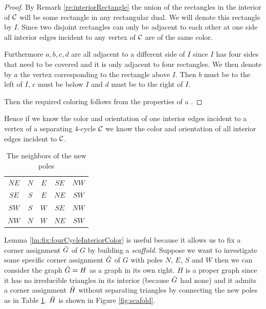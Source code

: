   \begin{proof}
  By Remark \ref{re:interiorRectangle} the union of the rectangles in the interior of $\mathcal{C}$ will be some rectangle in any rectangular dual. We will denote this rectangle by $I$. Since two disjoint rectangles can only be adjacent to each other at one side all interior edges incident to any vertex of $\mathcal{C}$ are of the same color.

  Furthermore $a, b, c, d$ are all adjacent to a different side of $I$ since $I$ has four sides that need to be covered and it is only adjacent to four rectangles. We then denote by $a$ the vertex corresponding to the rectangle above $I$. Then $b$ must be to the left of $I$, $c$ must be below $I$ and $d$ must be to the right of $I$.

  Then the required coloring follows from the properties of a \rel.

  \end{proof}

  Hence if we know the color and orientation of one interior edges incident to a vertex of a separating $4$-cycle $\mathcal{C}$ we know the color and orientation of all interior edges incident to $\mathcal{C}$.


  \begin{table}
    \centering
    \begin{tabular}{c|| c c c c}
      $NE$ & $N$ & $ E$ & $ SE$ & $ NW$ \\
      $SE$ & $S$ & $ E$ & $ NE$ & $ SW$\\
      $SW$ & $S$ & $ W$ & $ SE$ & $ NW$\\
      $NW$ & $N$ & $ W$ & $ NE$ & $ SW$\\
    \end{tabular}
    \caption{The neighbors of the new poles}
    \label{tab:scaffold}
  \end{table}

  Lemma \ref{lm:fix:fourCycleInteriorColor} is useful because it allows us to fix a corner assignment $\bar{G}$ of $G$ by building a \emph{scaffold}. Suppose we want to investigate some specific corner assignment $\bar{G}$ of $G$ with poles $N$, $E$, $S$ and $W$ then we can consider the graph $\bar{G} = H$ as a graph in its own right. $H$ is a proper graph since it has no irreducible triangles in its interior (because $\bar{G}$ had none) and it admits a corner assignment $\bar{H}$ without separating triangles by connecting the new poles as in Table \ref{tab:scaffold}. $\bar{H}$ is shown in Figure \ref{fig:scafold}.

